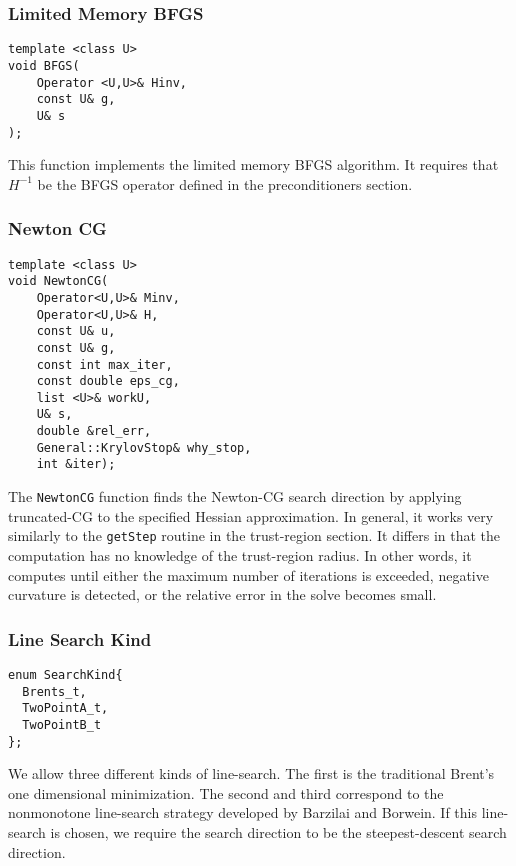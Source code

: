 \documentclass{article}
\begin{document}
\subsubsection{Limited Memory BFGS}

\begin{flushleft}
\begin{lstlisting}
template <class U>
void BFGS(
    Operator <U,U>& Hinv,
    const U& g,
    U& s
);
\end{lstlisting}
\end{flushleft}

	This function implements the limited memory BFGS algorithm.  It requires that $H^{-1}$ be the BFGS operator defined in the preconditioners section.

\subsubsection{Newton CG}
\begin{flushleft}
\begin{lstlisting}
template <class U>
void NewtonCG(
    Operator<U,U>& Minv,
    Operator<U,U>& H,
    const U& u,
    const U& g,
    const int max_iter,
    const double eps_cg,
    list <U>& workU,
    U& s,
    double &rel_err,
    General::KrylovStop& why_stop,
    int &iter);
\end{lstlisting}
\end{flushleft}

The \texttt{NewtonCG} function finds the Newton-CG search direction by applying truncated-CG to the specified Hessian approximation.  In general, it works very similarly to the \texttt{getStep} routine in the trust-region section.  It differs in that the computation has no knowledge of the trust-region radius.  In other words, it computes until either the maximum number of iterations is exceeded, negative curvature is detected, or the relative error in the solve becomes small. 

\subsubsection{Line Search Kind}

\begin{flushleft}
\begin{lstlisting}
enum SearchKind{    
  Brents_t,   
  TwoPointA_t, 
  TwoPointB_t
};
\end{lstlisting}
\end{flushleft}
We allow three different kinds of line-search.  The first is the traditional Brent's one dimensional minimization.  The second and third correspond to the nonmonotone line-search strategy developed by Barzilai and Borwein.  If this line-search is chosen, we require the search direction to be the steepest-descent search direction.
\end{document}
